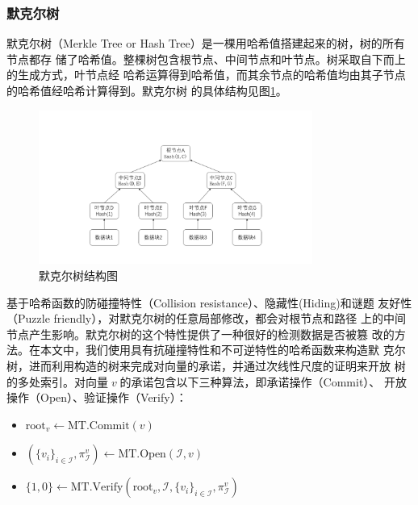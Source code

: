 \documentclass[zihao=-4]{ctexart}
\begin{document}
\begin{spacing}{1.5}
\subsubsection{默克尔树}
默克尔树\cite{Merkle}（Merkle Tree or Hash Tree）是一棵用哈希值搭建起来的树，树的所有节点都存
储了哈希值。整棵树包含根节点、中间节点和叶节点。树采取自下而上的生成方式，叶节点经
哈希运算得到哈希值，而其余节点的哈希值均由其子节点的哈希值经哈希计算得到。默克尔树
的具体结构见图\ref{Merkle}。
\begin{figure}[H]
  \centering
  \includegraphics[width=0.8\textwidth]{Merkle_tree.bmp} 
  \caption{默克尔树结构图}
  \label{Merkle}
\end{figure}
基于哈希函数的防碰撞特性（Collision resistance）、隐藏性(Hiding)和谜题
友好性（Puzzle friendly），对默克尔树的任意局部修改，都会对根节点和路径
上的中间节点产生影响。默克尔树的这个特性提供了一种很好的检测数据是否被篡
改的方法。在本文中，我们使用具有抗碰撞特性和不可逆特性的哈希函数来构造默
克尔树，进而利用构造的树来完成对向量的承诺，并通过次线性尺度的证明来开放
树的多处索引。对向量$\;v\;$的承诺包含以下三种算法，即承诺操作（Commit）、
开放操作（Open）、验证操作（Verify）：
\begin{itemize}
  \item $\text{root}_v\leftarrow \text{MT.Commit}(v)$
  \item $(\{v_i\}_{i\in\mathcal{I}},\pi^v_{\mathcal{I}})\leftarrow\text{MT.Open}(\mathcal{I},v)$
  \item $\{1,0\}\leftarrow\text{MT.Verify}(\text{root}_v,\mathcal{I},\{v_i\}_{i\in\mathcal{I}},\pi^v_{\mathcal{I}})$
\end{itemize}


\end{spacing}
\end{document}
